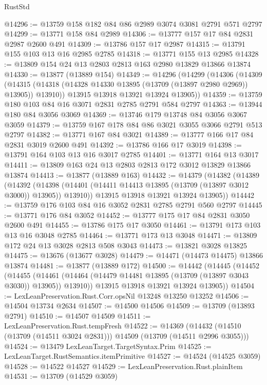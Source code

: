 \begin{lexlean}{RustStd}
\begin{coremodule}
@14296 := @13759 @158 @182 @84 @86 @2989 @3074 @3081 @2791 @571 @2797
@14299 := @13771 @158 @84 @2989
@14306 := @13777 @157 @17 @84 @2831 @2987 @2600 @491
@14309 := @13786 @157 @17 @2987
@14315 := @13791 @155 @103 @13 @16 @2985 @2785
@14318 := @13771 @155 @13 @2985
@14328 := @13809 @154 @24 @13 @2803 @2813 @163 @2980 @13829 @13866 @13874
@14330 := @13877 (@13889 @154)
@14349 := @14296
    (@14299
      (@14306
        (@14309
          (@14315 (@14318 (@14328 @14330 @13895 (@13709 (@13897 @2980 @2969)) @13905)) @13910))
        @13915
        @13918
        @13921
        @13924
        @13905))
@14359 := @13759 @180 @103 @84 @16 @3071 @2831 @2785 @2791 @584 @2797
@14363 := @13944 @180 @84 @3056 @3069
@14369 := @13746 @179 @13748 @84 @3056 @3067 @3059
@14379 := @13759 @167 @178 @84 @86 @3021 @3055 @3066 @2791 @513 @2797
@14382 := @13771 @167 @84 @3021
@14389 := @13777 @166 @17 @84 @2831 @3019 @2600 @491
@14392 := @13786 @166 @17 @3019
@14398 := @13791 @164 @103 @13 @16 @3017 @2785
@14401 := @13771 @164 @13 @3017
@14411 := @13809 @163 @24 @13 @2803 @2813 @172 @3012 @13829 @13866 @13874
@14413 := @13877 (@13889 @163)
@14432 := @14379
    (@14382
      (@14389
        (@14392
          (@14398 (@14401 (@14411 @14413 @13895 (@13709 (@13897 @3012 @3000)) @13905)) @13910))
        @13915
        @13918
        @13921
        @13924
        @13905))
@14442 := @13759 @176 @103 @84 @16 @3052 @2831 @2785 @2791 @560 @2797
@14445 := @13771 @176 @84 @3052
@14452 := @13777 @175 @17 @84 @2831 @3050 @2600 @491
@14455 := @13786 @175 @17 @3050
@14461 := @13791 @173 @103 @13 @16 @3048 @2785
@14464 := @13771 @173 @13 @3048
@14471 := @13809 @172 @24 @13 @3028 @2813 @508 @3043
@14473 := @13821 @3028 @13825
@14475 := @13676 (@13677 @3028)
@14479 := @14471 (@14473 @14475) @13866 @13874
@14481 := @13877 (@13889 @172)
@14500 := @14442
    (@14445
      (@14452
        (@14455
          (@14461 (@14464 (@14479 @14481 @13895 (@13709 (@13897 @3043 @3030)) @13905)) @13910))
        @13915
        @13918
        @13921
        @13924
        @13905))
@14504 := LexLeanPreservation.Rust.Corr.opsNil @13248 @13250 @13252
@14506 := @14504 @13734 @2634
@14507 := @14500 @14506
@14509 := @13709 (@13893 @2791)
@14510 := @14507 @14509
@14511 := LexLeanPreservation.Rust.tempFresh
@14522 := @14369
    (@14432 (@14510 (@13709 (@14511 @3024 @2831))) @14509 (@13709 (@14511 @2996 @3055)))
@14524 := @13479 LexLeanTarget.TargetSyntax.Prim
@14525 := LexLeanTarget.RustSemantics.itemPrimitive
@14527 := @14524 (@14525 @3059)
@14528 := @14522 @14527
@14529 := LexLeanPreservation.Rust.plainItem
@14531 := @13709 (@14529 @3059)

\end{coremodule}
\end{lexlean}
